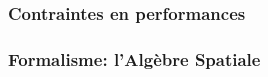 \documentclass[10pt]{beamer}
\begin{document}

\section{Contraintes en performances}

\begin{frame}
  \frametitle{}

%
%
%
%
%
%
%

\end{frame}


\section{Formalisme: l'Algèbre Spatiale}

\begin{frame}
  \frametitle{}
  \framesubtitle{}
\end{frame}


\part{}
\end{document}
